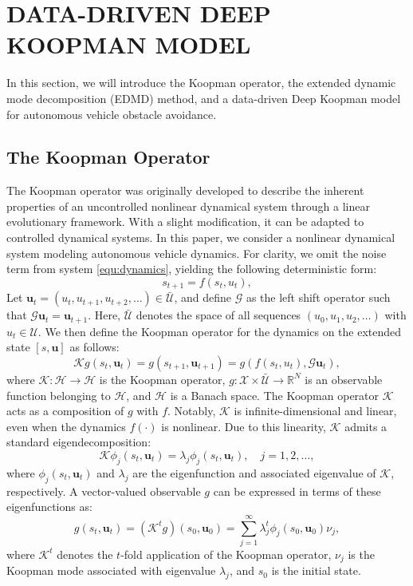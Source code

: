 \documentclass[pdflatex,sn-mathphys,Numbered]{sn-jnl}
\numberwithin{equation}{section}
\begin{document}
	\section{DATA-DRIVEN DEEP KOOPMAN MODEL}
	\label{sec3}
	
In this section, we will introduce the Koopman operator, the extended dynamic mode decomposition (EDMD) method, and a data-driven Deep Koopman model for autonomous vehicle obstacle avoidance.

\subsection{The Koopman Operator}

The Koopman operator was originally developed to describe the inherent properties of an uncontrolled nonlinear dynamical system through a linear evolutionary framework. With a slight modification, it can be adapted to controlled dynamical systems. In this paper, we consider a nonlinear dynamical system modeling autonomous vehicle dynamics. For clarity, we omit the noise term from system \eqref{equ:dynamics}, yielding the following deterministic form:
\begin{equation}
s_{t+1} = f(s_t, u_t), \label{equ:noiseless}
\end{equation}
Let $\mathbf{u}_t = (u_t, u_{t+1}, u_{t+2}, \ldots) \in \bar{\mathcal{U}}$, and define $\mathcal{G}$ as the left shift operator such that $\mathcal{G} \mathbf{u}_t = \mathbf{u}_{t+1}$. Here, $\bar{\mathcal{U}}$ denotes the space of all sequences $(u_0, u_1, u_2, \ldots)$ with $u_t \in \mathcal{U}$. We then define the Koopman operator for the dynamics on the extended state $[s, \mathbf{u}]$ as follows:
\begin{equation}
\mathcal{K} g(s_t, \mathbf{u}_t) = g(s_{t+1}, \mathbf{u}_{t+1}) = g(f(s_t, u_t), \mathcal{G} \mathbf{u}_t), \label{equ:extendedControl}
\end{equation}
where $\mathcal{K}: \mathcal{H} \to \mathcal{H}$ is the Koopman operator, $g: \mathcal{X} \times \bar{\mathcal{U}} \to \mathbb{R}^N$ is an observable function belonging to $\mathcal{H}$, and $\mathcal{H}$ is a Banach space. The Koopman operator $\mathcal{K}$ acts as a composition of $g$ with $f$. Notably, $\mathcal{K}$ is infinite-dimensional and linear, even when the dynamics $f(\cdot)$ is nonlinear. Due to this linearity, $\mathcal{K}$ admits a standard eigendecomposition:
\begin{equation}
\mathcal{K} \phi_j(s_t, \mathbf{u}_t) = \lambda_j \phi_j(s_t, \mathbf{u}_t), \quad j = 1, 2, \ldots, \label{equ:eig}
\end{equation}
where $\phi_j(s_t, \mathbf{u}_t)$ and $\lambda_j$ are the eigenfunction and associated eigenvalue of $\mathcal{K}$, respectively. A vector-valued observable $g$ can be expressed in terms of these eigenfunctions as:
\begin{equation}
g(s_t, \mathbf{u}_t) = (\mathcal{K}^t g)(s_0, \mathbf{u}_0) = \sum_{j=1}^{\infty} \lambda_j^t \phi_j(s_0, \mathbf{u}_0) \nu_j, \label{equ:eigenfunction}
\end{equation}
where $\mathcal{K}^t$ denotes the $t$-fold application of the Koopman operator, $\nu_j$ is the Koopman mode associated with eigenvalue $\lambda_j$, and $s_0$ is the initial state. 
\end{document}

